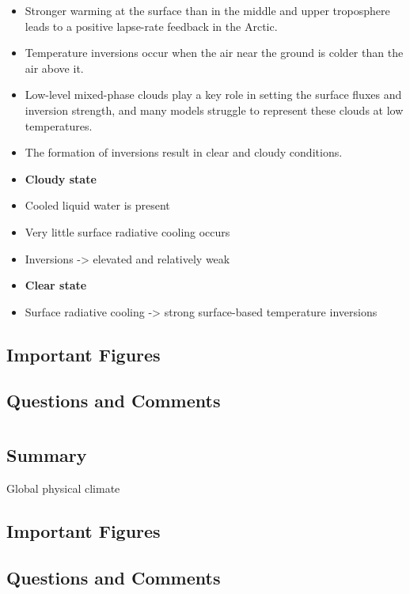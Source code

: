 \documentclass{article}
\begin{document}
\begin{itemize}
\item Stronger warming at the surface than in the middle and upper troposphere leads to a positive lapse-rate feedback in the Arctic.
\item Temperature inversions occur when the air near the ground is colder than the air above it.
\item Low-level mixed-phase clouds play a key role in setting the surface fluxes and inversion strength, and many models struggle to represent these clouds at low temperatures.
\item The formation of inversions result in clear and cloudy conditions.
\item \textbf{Cloudy state}
\item Cooled liquid water is present
\item Very little surface radiative cooling occurs
\item Inversions -> elevated and relatively weak
\item \textbf{Clear state}
\item Surface radiative cooling ->  strong surface-based temperature inversions
\end{itemize}
\subsection*{Important Figures}
\subsection*{Questions and Comments}
\newpage
\clearpage
\newpage
\clearpage


\def \sect {Hartmann2016}
\section{\citeauthor{\sect} \citeyear{\sect}}
\textbf{\citefield{\sect}{title}\nocite{\sect}}
\subsection*{Summary}
Global physical climate 
\subsection*{Important Figures}
\subsection*{Questions and Comments}
\newpage
\clearpage
\newpage
\clearpage



\printbibliography
% 
% 
\end{document}
